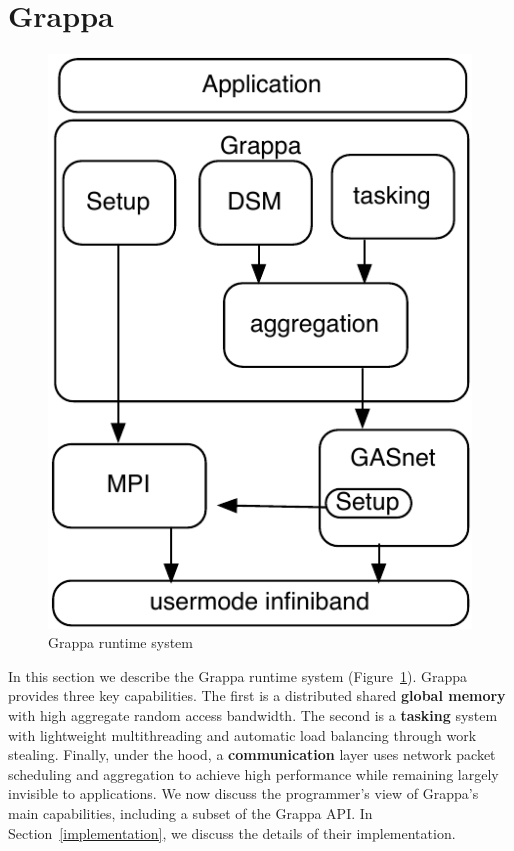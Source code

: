 \section{Grappa} \label{sec:grappa}

\begin{figure}[t]
\begin{center}
  \includegraphics[width=0.5\columnwidth]{figs/grappa-crappy}
\begin{minipage}{0.95\columnwidth}
  \caption{\label{fig:grappa} Grappa runtime system \vspace{-4ex}}
\end{minipage}
\vspace{-3ex}
\end{center}
\end{figure}

In this section we describe the Grappa runtime system
(Figure~\ref{fig:grappa}). 
Grappa provides three key capabilities. The first is a distributed
shared \textbf{global memory} with high aggregate random access
bandwidth. The second is a \textbf{tasking} system with lightweight
multithreading and automatic load balancing through work
stealing. Finally, under the hood, a \textbf{communication} layer uses
network packet scheduling and aggregation to achieve high performance
while remaining largely invisible to applications. We now discuss the programmer's view of
Grappa's main capabilities, including a subset of the Grappa API. In
Section~\ref{implementation}, we discuss the details of their
implementation.

